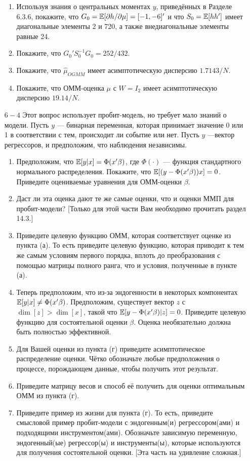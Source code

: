 \begin{enumerate}
\begin{enumerate}
\item Используя знания о центральных моментах $y$, приведённых в Разделе 6.3.6, покажите, что $G_0 = \mathbb{E}[\partial{h}/\partial{\mu}] = [-1,-6]'$ и что $S_0 = \mathbb{E}[hh']$ имеет диагональные элементы 2 и 720, а также внедиагональные элементы равные 24.
\item Покажите, что $G_0'S_0^{-1}G_0 = 252/432$.
\item Покажите, что $\hat{\mu}_{OGMM}$ имеет асимптотическую дисперсию $1.7143/N$.
\item Покажите, что ОММ-оценка $\mu$ с $W = I_2$ имеет асимптотическую дисперсию $19.14/N$.
\end{enumerate}
\item [$6 - 4$] Этот вопрос использует пробит-модель, но требует мало знаний о модели. Пусть $y$ --- бинарная переменная, которая принимает значение 0 или 1 в соответствии с тем, происходит ли событие или нет. Пусть $y$ ---вектор регрессоров, и предположим, что наблюдения независимы.
\begin{enumerate}
\item Предположим, что $\mathbb{E}[y|x] = \Phi(x'\beta)$, где $\Phi(\cdot)$ --- функция стандартного нормального распределения. Покажите, что $\mathbb{E}[(y-\Phi(x'\beta))x] = 0$. Приведите оцениваемые уравнения для ОММ-оценки $\beta$.
\item Даст ли эта оценка дают те же самые оценки, что и оценки ММП для пробит-модели? [Только для этой части Вам необходимо прочитать раздел 14.3.]
\item Приведите целевую функцию ОММ, которая соответствует оценке из пункта (а). То есть приведите целевую функцию, которая приводит к тем же самым условиям первого порядка, вплоть до преобразования  с помощью матрицы полного ранга, что и условия, полученные в пункте (а).
\item Теперь предположим, что из-за эндогенности в некоторых компонентах $\mathbb{E}[y|x] \not= \Phi(x'\beta)$. Предположим, существует вектор $z$ с $\dim[z] > \dim[x]$, такой что $\mathbb{E}[y - \Phi(x'\beta)|z] = 0$. Приведите целевую функцию для состоятельной оценки $\beta$. Оценка необязательно должна быть полностью эффективной.
\item Для Вашей оценки из пункта (г) приведите асимптотическое распределение оценки. Чётко обозначьте любые предположения о процессе, порождающем данные, чтобы получить этот результат.
\item Приведите матрицу весов и способ её получить для оценки оптимальным ОММ из пункта (г).
\item Приведите  пример из жизни для пункта (г). То есть, приведите смысловой пример пробит-модели с эндогенным(и) регрессором(ами) и подходящими инструментом(ами). Обозначьте зависимую переменную, эндогенный(ые) регрессор(ы) и инструменты(ы), которые используются для получения состоятельной оценки. [Эта часть на удивление сложная.]

\end{enumerate}
\end{enumerate}
